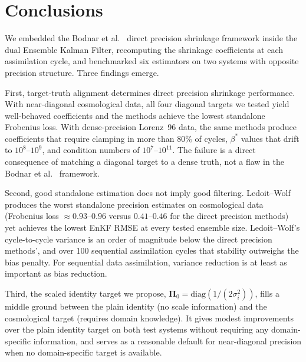 \section{Conclusions}
\label{sec:conclusions}

We embedded the Bodnar et al.~\cite{bodnar2016direct} direct precision shrinkage framework inside the dual Ensemble Kalman Filter, recomputing the shrinkage coefficients at each assimilation cycle, and benchmarked six estimators on two systems with opposite precision structure. Three findings emerge.

First, target-truth alignment determines direct precision shrinkage performance. With near-diagonal cosmological data, all four diagonal targets we tested yield well-behaved coefficients and the methods achieve the lowest standalone Frobenius loss. With dense-precision Lorenz~96 data, the same methods produce coefficients that require clamping in more than 80\% of cycles, $\beta^*$ values that drift to $10^8$--$10^9$, and condition numbers of $10^7$--$10^{11}$. The failure is a direct consequence of matching a diagonal target to a dense truth, not a flaw in the Bodnar et al.~\cite{bodnar2016direct} framework.

Second, good standalone estimation does not imply good filtering. Ledoit--Wolf produces the worst standalone precision estimates on cosmological data (Frobenius loss $\approx 0.93$--$0.96$ versus $0.41$--$0.46$ for the direct precision methods) yet achieves the lowest EnKF RMSE at every tested ensemble size. Ledoit--Wolf's cycle-to-cycle variance is an order of magnitude below the direct precision methods', and over 100 sequential assimilation cycles that stability outweighs the bias penalty. For sequential data assimilation, variance reduction is at least as important as bias reduction.

Third, the scaled identity target we propose, $\boldsymbol{\Pi}_0 = \mathrm{diag}(1/(2\sigma_i^2))$, fills a middle ground between the plain identity (no scale information) and the cosmological target (requires domain knowledge). It gives modest improvements over the plain identity target on both test systems without requiring any domain-specific information, and serves as a reasonable default for near-diagonal precision when no domain-specific target is available.

